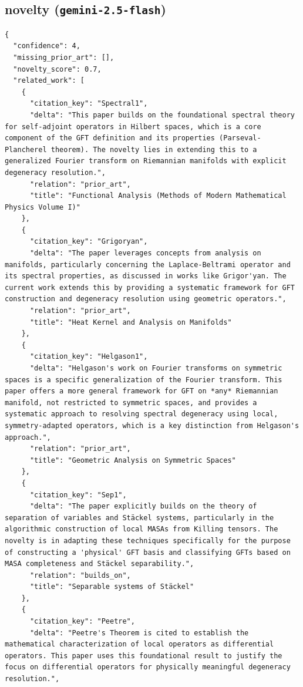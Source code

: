 \documentclass[11pt]{article}
\begin{document}
\subsection*{novelty (\texttt{gemini-2.5-flash})}
\begin{verbatim}
{
  "confidence": 4,
  "missing_prior_art": [],
  "novelty_score": 0.7,
  "related_work": [
    {
      "citation_key": "Spectral1",
      "delta": "This paper builds on the foundational spectral theory for self-adjoint operators in Hilbert spaces, which is a core component of the GFT definition and its properties (Parseval-Plancherel theorem). The novelty lies in extending this to a generalized Fourier transform on Riemannian manifolds with explicit degeneracy resolution.",
      "relation": "prior_art",
      "title": "Functional Analysis (Methods of Modern Mathematical Physics Volume I)"
    },
    {
      "citation_key": "Grigoryan",
      "delta": "The paper leverages concepts from analysis on manifolds, particularly concerning the Laplace-Beltrami operator and its spectral properties, as discussed in works like Grigor'yan. The current work extends this by providing a systematic framework for GFT construction and degeneracy resolution using geometric operators.",
      "relation": "prior_art",
      "title": "Heat Kernel and Analysis on Manifolds"
    },
    {
      "citation_key": "Helgason1",
      "delta": "Helgason's work on Fourier transforms on symmetric spaces is a specific generalization of the Fourier transform. This paper offers a more general framework for GFT on *any* Riemannian manifold, not restricted to symmetric spaces, and provides a systematic approach to resolving spectral degeneracy using local, symmetry-adapted operators, which is a key distinction from Helgason's approach.",
      "relation": "prior_art",
      "title": "Geometric Analysis on Symmetric Spaces"
    },
    {
      "citation_key": "Sep1",
      "delta": "The paper explicitly builds on the theory of separation of variables and Stäckel systems, particularly in the algorithmic construction of local MASAs from Killing tensors. The novelty is in adapting these techniques specifically for the purpose of constructing a 'physical' GFT basis and classifying GFTs based on MASA completeness and Stäckel separability.",
      "relation": "builds_on",
      "title": "Separable systems of Stäckel"
    },
    {
      "citation_key": "Peetre",
      "delta": "Peetre's Theorem is cited to establish the mathematical characterization of local operators as differential operators. This paper uses this foundational result to justify the focus on differential operators for physically meaningful degeneracy resolution.",

\end{verbatim}
\end{document}
